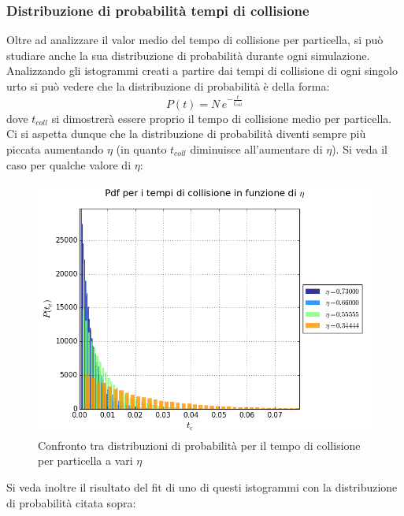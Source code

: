 \subsubsection{Distribuzione di probabilità tempi di collisione}
Oltre ad analizzare il valor medio del tempo di collisione per particella, si può studiare anche la sua distribuzione di probabilità durante ogni simulazione.\\
Analizzando gli istogrammi creati a partire dai tempi di collisione di ogni singolo urto si può vedere che la distribuzione di probabilità è della forma:
$$
	P(t) = N \, e^{-\frac{t}{t_{coll}}}
$$ 
dove $t_{coll}$ si dimostrerà essere proprio il tempo di collisione medio per particella.\\
Ci si aspetta dunque che la distribuzione di probabilità diventi sempre più piccata aumentando $\eta$ (in quanto $t_{coll}$ diminuisce all'aumentare di $\eta$).
Si veda il caso per qualche valore di $\eta$:
\begin{center}
	\begin{figure}[h]
	\centering
		\includegraphics[scale=0.5]{sfere2D/pdf_tc.png}
	\caption{Confronto tra distribuzioni di probabilità per il tempo di collisione per particella a vari $\eta$}
	\end{figure}
\end{center}

Si veda inoltre il risultato del fit di uno di questi istogrammi con la distribuzione di probabilità citata sopra:

